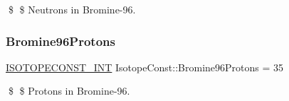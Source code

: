 \$ \$ Neutrons in Bromine-\/96. \mbox{\label{group___isotope_const-_bromine-_br96_gaf2a6deb1b5eb0870a2d96b88a62b2e6d}} 
\subsubsection{\texorpdfstring{Bromine96\+Protons}{Bromine96Protons}}
{\footnotesize\ttfamily \mbox{\hyperlink{group___isotope_const-_macros_ga5f18360b3e99483a35c32d789e62621c}{I\+S\+O\+T\+O\+P\+E\+C\+O\+N\+S\+T\+\_\+\+I\+NT}} Isotope\+Const\+::\+Bromine96\+Protons = 35}

\$ \$ Protons in Bromine-\/96. 